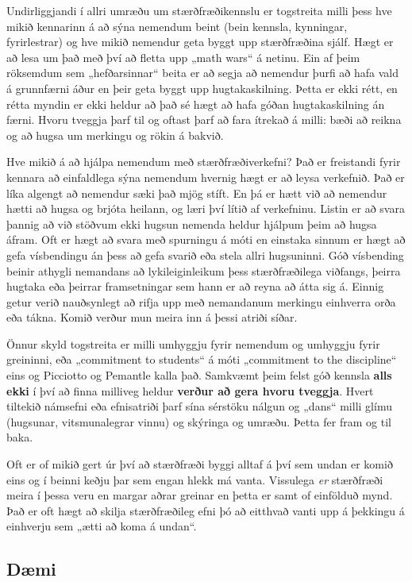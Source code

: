 \documentclass[
  icelandic,
]{book}
\begin{document}
Undirliggjandi í allri umræðu um stærðfræðikennslu er togstreita milli þess hve mikið kennarinn á að sýna nemendum beint (bein kennsla, kynningar, fyrirlestrar) og hve mikið nemendur geta byggt upp stærðfræðina sjálf. Hægt er að lesa um það með því að fletta upp „math wars`` á netinu. Ein af þeim röksemdum sem „hefðarsinnar`` beita er að segja að nemendur þurfi að hafa vald á grunnfærni áður en þeir geta byggt upp hugtakaskilning. Þetta er ekki rétt, en rétta myndin er ekki heldur að það sé hægt að hafa góðan hugtakaskilning án færni. Hvoru tveggja þarf til og oftast þarf að fara ítrekað á milli: bæði að reikna og að hugsa um merkingu og rökin á bakvið.

Hve mikið á að hjálpa nemendum með stærðfræðiverkefni? Það er freistandi fyrir kennara að einfaldlega sýna nemendum hvernig hægt er að leysa verkefnið. Það er líka algengt að nemendur sæki það mjög stíft. En þá er hætt við að nemendur hætti að hugsa og brjóta heilann, og læri því lítið af verkefninu. Listin er að svara þannig að við stöðvum ekki hugsun nemenda heldur hjálpum þeim að hugsa áfram. Oft er hægt að svara með spurningu á móti en einstaka sinnum er hægt að gefa vísbendingu án þess að gefa svarið eða stela allri hugsuninni. Góð vísbending beinir athygli nemandans að lykileiginleikum þess stærðfræðilega viðfangs, þeirra hugtaka eða þeirrar framsetningar sem hann er að reyna að átta sig á. Einnig getur verið nauðsynlegt að rifja upp með nemandanum merkingu einhverra orða eða tákna. Komið verður mun meira inn á þessi atriði síðar.

Önnur skyld togstreita er milli umhyggju fyrir nemendum og umhyggju fyrir greininni, eða „commitment to students`` á móti „commitment to the discipline`` eins og Picciotto og Pemantle kalla það. Samkvæmt þeim felst góð kennsla \textbf{alls ekki} í því að finna milliveg heldur \textbf{verður að gera hvoru tveggja}. Hvert tiltekið námsefni eða efnisatriði þarf sína sérstöku nálgun og „dans`` milli glímu (hugsunar, vitsmunalegrar vinnu) og skýringa og umræðu. Þetta fer fram og til baka.

Oft er of mikið gert úr því að stærðfræði byggi alltaf á því sem undan er komið eins og í beinni keðju þar sem engan hlekk má vanta. Vissulega \emph{er} stærðfræði meira í þessa veru en margar aðrar greinar en þetta er samt of einfölduð mynd. Það er oft hægt að skilja stærðfræðileg efni þó að eitthvað vanti upp á þekkingu á einhverju sem „ætti að koma á undan``.

\subsection{Dæmi}\label{duxe6mi-2}
\end{document}
